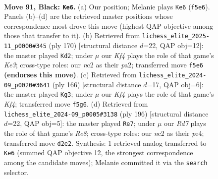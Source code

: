 \documentclass[11pt]{article}
\begin{document}
\clearpage

\begin{figure}[p]\centering
\begin{subfigure}{0.46\textwidth}\centering
\resizebox{\linewidth}{!}{%
\newchessgame
\chessboard[
  setfen={8/6p1/5p2/5k1p/7P/6P1/1RNr4/6K1 b - - 7 91},
  showmover=false,
  pgfstyle=straightmove, color=movearrow, markmove={f5-e6}
]}
\caption{}
\end{subfigure}\hfill
\begin{subfigure}{0.46\textwidth}\centering
\resizebox{\linewidth}{!}{%
\newchessgame
\chessboard[
  setfen={8/8/6p1/4k2p/7P/r3K1P1/p7/R7 w - - 10 86},
  showmover=false,
  pgfstyle=straightmove, color=movearrow, markmove={e3-d2}
]}
\caption{}
\end{subfigure}
\\[4pt]
\begin{subfigure}{0.46\textwidth}\centering
\resizebox{\linewidth}{!}{%
\newchessgame
\chessboard[
  setfen={6k1/R7/6p1/1r4Pp/5K1P/5P2/8/8 w - - 3 84},
  showmover=false,
  pgfstyle=straightmove, color=movearrow, markmove={f4-g3}
]}
\caption{}
\end{subfigure}\hfill
\begin{subfigure}{0.46\textwidth}\centering
\resizebox{\linewidth}{!}{%
\newchessgame
\chessboard[
  setfen={4R3/7p/6pP/3k2P1/4p1K1/4r3/8/8 w - - 2 99},
  showmover=false,
  pgfstyle=straightmove, color=movearrow, markmove={e8-e7}
]}
\caption{}
\end{subfigure}
\caption{\textbf{Move 91, Black: \texttt{Ke6}.} (a) Our position; Melanie plays \texttt{Ke6} (\texttt{f5e6}). Panels (b)--(d) are the retrieved master positions whose correspondence most drove this move (highest QAP objective among those that transfer to it). (b) Retrieved from \texttt{lichess\_elite\_2025-11\_p0000\#345} (ply 170) [structural distance $d$=22, QAP obj=12]: the master played \texttt{Kd2}; under $\mu$ our \emph{Kf4} plays the role of that game's \emph{Ke3}; cross-type roles: our \emph{n}c2 as their \emph{p}a2; transferred move \texttt{f5e6} \textbf{(endorses this move)}. (c) Retrieved from \texttt{lichess\_elite\_2024-09\_p0020\#3641} (ply 166) [structural distance $d$=17, QAP obj=6]: the master played \texttt{Kg3}; under $\mu$ our \emph{Kf4} plays the role of that game's \emph{Kf4}; transferred move \texttt{f5g6}. (d) Retrieved from \texttt{lichess\_elite\_2024-09\_p0005\#3138} (ply 196) [structural distance $d$=22, QAP obj=5]: the master played \texttt{Re7}; under $\mu$ our \emph{Rd7} plays the role of that game's \emph{Re8}; cross-type roles: our \emph{n}c2 as their \emph{p}e4; transferred move \texttt{d2e2}. Synthesis: 1 retrieved analog transferred to \texttt{Ke6} (summed QAP objective 12, the strongest correspondence among the candidate moves); Melanie committed it via the \texttt{search} selector.}
\label{fig:thought-m181}
\end{figure}
\end{document}

